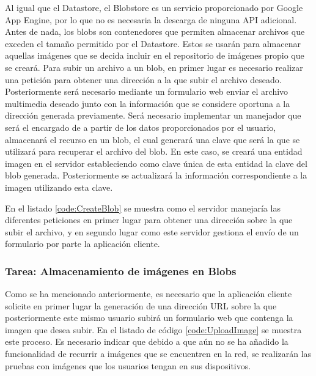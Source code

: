 Al igual que el Datastore, el Blobstore es un servicio proporcionado por Google App Engine, por lo que no es necesaria la descarga de ninguna \ac{API} adicional. Antes de nada, los blobs son contenedores que permiten almacenar archivos que exceden el tamaño permitido por el Datastore. Estos se usarán para almacenar aquellas imágenes que se decida incluir en el repositorio de imágenes propio que se creará. Para subir un archivo a un blob, en primer lugar es necesario realizar una petición para obtener una dirección a la que subir el archivo deseado. Posteriormente será necesario mediante un formulario web enviar el archivo multimedia deseado junto con la información que se considere oportuna a la dirección generada previamente. Será necesario implementar un manejador que será el encargado de a partir de los datos proporcionados por el usuario, almacenará el recurso en un blob, el cual generará una clave que será la que se utilizará para recuperar el archivo del blob. En este caso, se creará una entidad imagen en el servidor estableciendo como clave única de esta entidad la clave del blob generada. Posteriormente se actualizará la información correspondiente a la imagen utilizando esta clave.


En el listado \ref{code:CreateBlob} se muestra como el servidor manejaría las diferentes peticiones en primer lugar para obtener una dirección sobre la que subir el archivo, y en segundo lugar como este servidor gestiona el envío de un formulario por parte la aplicación cliente.




\subsubsection{Tarea: Almacenamiento de imágenes en Blobs}

Como se ha mencionado anteriormente, es necesario que la aplicación cliente solicite en primer lugar la generación de una dirección \acs{URL} sobre la que posteriormente este mismo usuario subirá un formulario web que contenga la imagen que desea subir. En el listado de código \ref{code:UploadImage} se muestra este proceso. Es necesario indicar que debido a que aún no se ha añadido la funcionalidad de recurrir a imágenes que se encuentren en la red, se realizarán las pruebas con imágenes que los usuarios tengan en sus dispositivos.


